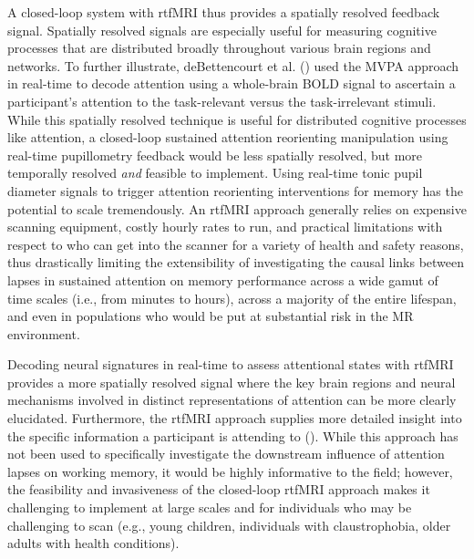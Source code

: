 A closed-loop system with rtfMRI thus provides a spatially resolved feedback signal. Spatially resolved signals are especially useful for measuring cognitive processes that are distributed broadly throughout various brain regions and networks. To further illustrate, deBettencourt et al. (\cite*{megan2015closed}) used the MVPA approach in real-time to decode attention using a whole-brain BOLD signal to ascertain a participant’s attention to the task-relevant versus the task-irrelevant stimuli. While this spatially resolved technique is useful for distributed cognitive processes like attention, a closed-loop sustained attention reorienting manipulation using real-time pupillometry feedback would be less spatially resolved, but more temporally resolved \emph{and} feasible to implement. Using real-time tonic pupil diameter signals to trigger attention reorienting interventions for memory has the potential to scale tremendously. An rtfMRI approach generally relies on expensive scanning equipment, costly hourly rates to run, and practical limitations with respect to who can get into the scanner for a variety of health and safety reasons, thus drastically limiting the extensibility of investigating the causal links between lapses in sustained attention on memory performance across a wide gamut of time scales (i.e., from minutes to hours), across a majority of the entire lifespan, and even in populations who would be put at substantial risk in the MR environment. 

Decoding neural signatures in real-time to assess attentional states with rtfMRI provides a more spatially resolved signal where the key brain regions and neural mechanisms involved in distinct representations of attention can be more clearly elucidated. Furthermore, the rtfMRI approach supplies more detailed insight into the specific information a participant is attending to (\cite{megan2015closed}). While this approach has not been used to specifically investigate the downstream influence of attention lapses on working memory, it would be highly informative to the field; however, the feasibility and invasiveness of the closed-loop rtfMRI approach makes it challenging to implement at large scales and for individuals who may be challenging to scan (e.g., young children, individuals with claustrophobia, older adults with health conditions).


